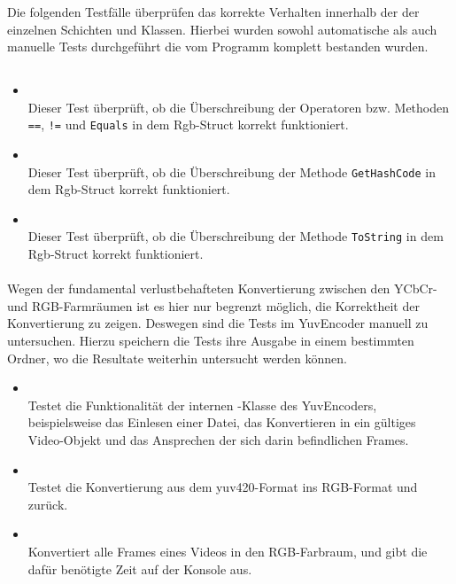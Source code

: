 Die folgenden Testfälle überprüfen das korrekte Verhalten innerhalb der der einzelnen Schichten und Klassen. Hierbei wurden sowohl automatische als auch manuelle Tests durchgeführt die vom Programm komplett bestanden wurden.

\subsection{}

\paragraph{}

\begin{itemize}

\item{}~\\
Dieser Test überprüft, ob die Überschreibung der Operatoren bzw. Methoden \verb#==#, \verb#!=# und \verb#Equals# in dem Rgb-Struct korrekt funktioniert.

\item{}~\\
Dieser Test überprüft, ob die Überschreibung der Methode \verb#GetHashCode# in dem Rgb-Struct korrekt funktioniert.

\item{}~\\
Dieser Test überprüft, ob die Überschreibung der Methode \verb#ToString# in dem Rgb-Struct korrekt funktioniert.
\end{itemize}

\paragraph{}
Wegen der fundamental verlustbehafteten Konvertierung zwischen den YCbCr- und RGB-Farmräumen ist es hier nur begrenzt möglich, die Korrektheit der Konvertierung zu zeigen. Deswegen sind die Tests im YuvEncoder manuell zu untersuchen. Hierzu speichern die Tests ihre Ausgabe in einem bestimmten Ordner, wo die Resultate weiterhin untersucht werden können.
\begin{itemize}
	\item {}~\\
	Testet die Funktionalität der internen -Klasse des YuvEncoders, beispielsweise das Einlesen einer Datei, das Konvertieren in ein gültiges Video-Objekt und das Ansprechen der sich darin befindlichen Frames.
	\item {}~\\
	Testet die Konvertierung aus dem yuv420-Format ins RGB-Format und zurück.
	\item {}~\\
	Konvertiert alle Frames eines Videos in den RGB-Farbraum, und gibt die dafür benötigte Zeit auf der Konsole aus.
\end{itemize}

